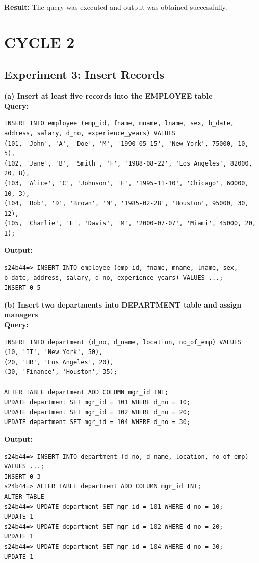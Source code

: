 \documentclass[12pt, a4paper]{article}
\begin{document}
\textbf{Result:} The query was executed and output was obtained successfully.

\newpage
\section*{CYCLE 2}

\subsection*{Experiment 3: Insert Records}

\textbf{(a) Insert at least five records into the EMPLOYEE table}\\
\textbf{Query:}
\begin{lstlisting}
INSERT INTO employee (emp_id, fname, mname, lname, sex, b_date, address, salary, d_no, experience_years) VALUES
(101, 'John', 'A', 'Doe', 'M', '1990-05-15', 'New York', 75000, 10, 5),
(102, 'Jane', 'B', 'Smith', 'F', '1988-08-22', 'Los Angeles', 82000, 20, 8),
(103, 'Alice', 'C', 'Johnson', 'F', '1995-11-10', 'Chicago', 60000, 10, 3),
(104, 'Bob', 'D', 'Brown', 'M', '1985-02-28', 'Houston', 95000, 30, 12),
(105, 'Charlie', 'E', 'Davis', 'M', '2000-07-07', 'Miami', 45000, 20, 1);
\end{lstlisting}
\textbf{Output:}
\begin{lstlisting}[style=terminal]
s24b44=> INSERT INTO employee (emp_id, fname, mname, lname, sex, b_date, address, salary, d_no, experience_years) VALUES ...;
INSERT 0 5
\end{lstlisting}

\textbf{(b) Insert two departments into DEPARTMENT table and assign managers}\\
\textbf{Query:}
\begin{lstlisting}
INSERT INTO department (d_no, d_name, location, no_of_emp) VALUES
(10, 'IT', 'New York', 50),
(20, 'HR', 'Los Angeles', 20),
(30, 'Finance', 'Houston', 35);

ALTER TABLE department ADD COLUMN mgr_id INT;
UPDATE department SET mgr_id = 101 WHERE d_no = 10;
UPDATE department SET mgr_id = 102 WHERE d_no = 20;
UPDATE department SET mgr_id = 104 WHERE d_no = 30;
\end{lstlisting}
\textbf{Output:}
\begin{lstlisting}[style=terminal]
s24b44=> INSERT INTO department (d_no, d_name, location, no_of_emp) VALUES ...;
INSERT 0 3
s24b44=> ALTER TABLE department ADD COLUMN mgr_id INT;
ALTER TABLE
s24b44=> UPDATE department SET mgr_id = 101 WHERE d_no = 10;
UPDATE 1
s24b44=> UPDATE department SET mgr_id = 102 WHERE d_no = 20;
UPDATE 1
s24b44=> UPDATE department SET mgr_id = 104 WHERE d_no = 30;
UPDATE 1
\end{lstlisting}
\end{document}
